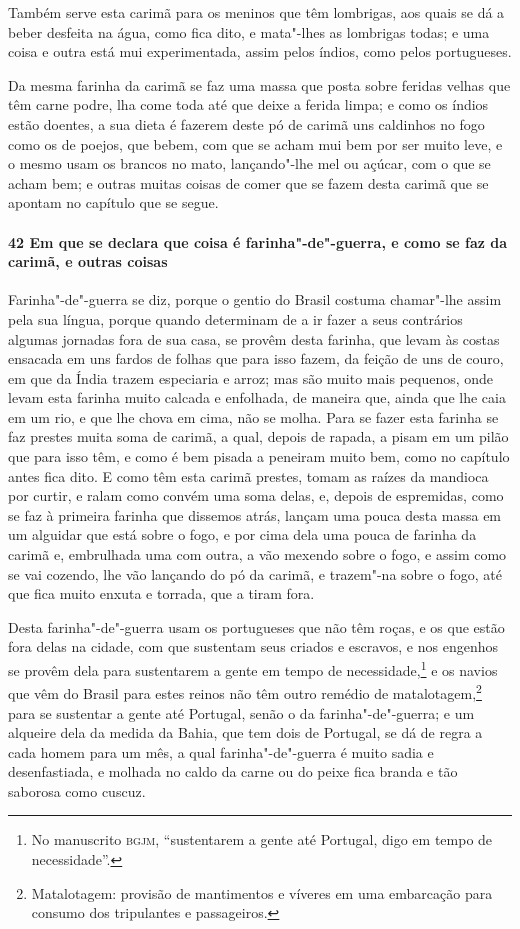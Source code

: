 Também serve esta carimã para os meninos que têm lombrigas, aos quais se dá a beber
desfeita na água, como fica dito, e mata"-lhes as lombrigas todas; e uma coisa e outra está
mui experimentada, assim pelos índios, como pelos portugueses.

Da mesma farinha da carimã se faz uma massa que posta sobre feridas velhas que têm carne
podre, lha come toda até que deixe a ferida limpa; e como os índios estão doentes, a sua
dieta é fazerem deste pó de carimã uns caldinhos no fogo como os de poejos, que bebem, com
que se acham mui bem por ser muito leve, e o mesmo usam os brancos no mato, lançando"-lhe
mel ou açúcar, com o que se acham bem; e outras muitas coisas de comer que se fazem desta
carimã que se apontam no capítulo que se segue.

\paragraph{42 Em que se declara que coisa é farinha"-de"-guerra, e como se faz da carimã, e
outras coisas}

Farinha"-de"-guerra se diz, porque o gentio do Brasil costuma chamar"-lhe assim pela sua
língua, porque quando determinam de a ir fazer a seus contrários algumas jornadas fora de
sua casa, se provêm desta farinha, que levam às costas ensacada em uns fardos de folhas
que para isso fazem, da feição de uns de couro, em que da Índia trazem especiaria e arroz;
mas são muito mais pequenos, onde levam esta farinha muito calcada e enfolhada, de maneira
que, ainda que lhe caia em um rio, e que lhe chova em cima, não se molha. Para se fazer
esta farinha se faz prestes muita soma de carimã, a qual, depois de rapada, a pisam em um
pilão que para isso têm, e como é bem pisada a peneiram muito bem, como no capítulo antes
fica dito. E como têm esta carimã prestes, tomam as raízes da mandioca por curtir, e ralam
como convém uma soma delas, e, depois de espremidas, como se faz à primeira farinha que
dissemos atrás, lançam uma pouca desta massa em um alguidar que está sobre o fogo, e por
cima dela uma pouca de farinha da carimã e, embrulhada uma com outra, a vão mexendo sobre
o fogo, e assim como se vai cozendo, lhe vão lançando do pó da carimã, e trazem"-na sobre o
fogo, até que fica muito enxuta e torrada, que a tiram fora.

Desta farinha"-de"-guerra usam os portugueses que não têm roças, e os que estão fora delas
na cidade, com que sustentam seus criados e escravos, e nos engenhos se provêm dela para
sustentarem a gente em tempo de necessidade,\footnote{ No manuscrito \textsc{bgjm},
``sustentarem a gente até Portugal, digo em tempo de necessidade''.} e os navios que vêm
do Brasil para estes reinos não têm outro remédio de matalotagem,\footnote{ Matalotagem:
provisão de mantimentos e víveres em uma embarcação para consumo dos tripulantes e
passageiros.} para se sustentar a gente até Portugal, senão o da farinha"-de"-guerra; e um
alqueire dela da medida da Bahia, que tem dois de Portugal, se dá de regra a cada homem
para um mês, a qual farinha"-de"-guerra é muito sadia e desenfastiada, e molhada no caldo da
carne ou do peixe fica branda e tão saborosa como cuscuz.

